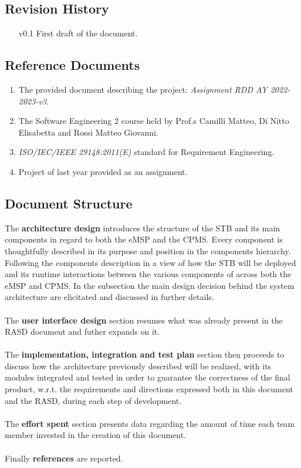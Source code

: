 \documentclass[11pt]{article}
\begin{document}
\subsection{Revision History}

\begin{enumerate}
    \item[v0.1] First draft of the document.
\end{enumerate}

\subsection{Reference Documents}

\begin{enumerate}
    \item The provided document describing the project: \textit{Assignment RDD AY 2022-2023-v3}.
    \item The Software Engineering 2 course held by Prof.s Camilli Matteo, Di Nitto Elisabetta and Rossi Matteo Giovanni.
    \item \textit{ISO/IEC/IEEE 29148:2011(E)} standard for Requirement Engineering.
    \item Project of last year provided as an assignment.
\end{enumerate}

\subsection{Document Structure}

The \textbf{architecture design} introduces the structure of the STB and its main components in regard to both the eMSP and the CPMS. Every component is thoughtfully described in its purpose and position in the components hierarchy. Following the components description in a view of how the STB will be deployed and its runtime interactions between the various components of across both the eMSP and CPMS. In the subsection the main design decision behind the system architecture are elicitated and discussed in further details. \\
\\
The \textbf{user interface design} section resumes what was already present in the RASD document and futher expands on it. \\
\\
The \textbf{implementation, integration and test plan} section then proceeds to discuss how the architecture previously described will be realized, with its modules integrated and tested in order to guarantee the correctness of the final product, w.r.t. the requirements and directions expressed both in this document and the RASD, during each step of development. \\
\\
The \textbf{effort spent} section presents data regarding the amount of time each team member invested in the creation of this document. \\
\\
Finally \textbf{references} are reported.
\end{document}
